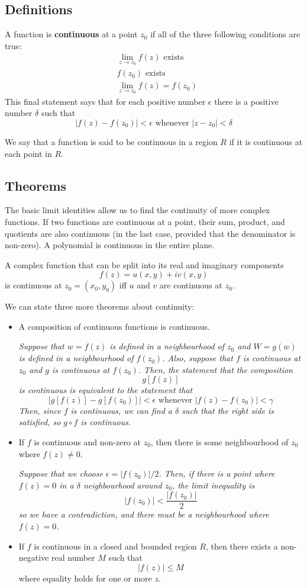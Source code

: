 \documentclass{article}
\renewcommand{\emph}{\textbf}
\begin{document}
\subsection{Definitions}
A function is \emph{continuous} at a point $z_0$ if all of the three following conditions are true:
\begin{align*}
	&\lim_{z \to z_0} f(z) \text{ exists} \\
	&f(z_0) \text{ exists} \\
	&\lim_{z \to z_0} f(z) = f(z_0)
\end{align*}
This final statement says that for each positive number $\epsilon$ there is a positive number $\delta$ such that
\[
	|f(z) - f(z_0)| < \epsilon \text{ whenever } |z - z_0| < \delta
\]

We say that a function is said to be continuous in a region $R$ if it is continuous at each point in $R$. 

\subsection{Theorems}
The basic limit identities allow us to find the continuity of more complex functions. If two functions are continuous at a point, their sum, product, and quotients are also continuous (in the last case, provided that the denominator is non-zero). A polynomial is continuous in the entire plane.

A complex function that can be split into its real and imaginary components
\[
	f(z) = u(x, y) + iv(x, y)
\]
is continuous at $z_0 = (x_0, y_0)$ iff $u$ and $v$ are continuous at $z_0$.

We can state three more theorems about continuity:
\begin{itemize}
	\item A composition of continuous functions is continuous.
	
	\textit{Suppose that $w = f(z)$ is defined in a neighbourhood of $z_0$ and $W = g(w)$ is defined in a neighbourhood of $f(z_0)$. Also, suppose that $f$ is continuous at $z_0$ and $g$ is continuous at $f(z_0)$. Then, the statement that the composition
	\[
		g[f(z)]
	\]
	is continuous is equivalent to the statement that
	\[
		|g[f(z)] - g[f(z_0)]| < \epsilon  \text{ whenever } | f(z) - f(z_0)| < \gamma
	\]
	Then, since $f$ is continuous, we can find a $\delta$ such that the right side is satisfied, so $g \circ f$ is continuous.
	}
	
	\item If $f$ is continuous and non-zero at $z_0$, then there is some neighbourhood of $z_0$ where $f(z) \neq 0$.
	
	\textit{Suppose that we choose $\epsilon = |f(z_0)| / 2$. Then, if there is a point where $f(z) = 0$ in a $\delta$ neighbourhood around $z_0$, the limit inequality is
	\[
		|f(z_0)| < \frac{|f(z_0)|}{2}
	\]
	so we have a contradiction, and there must be a neighbourhood where $f(z) = 0$.
	}
	
	\item If $f$ is continuous in a closed and bounded region $R$, then there exists a non-negative real number $M$ such that
	\[
		|f(z)| \le M
	\]
	where equality holds for one or more $z$.
\end{itemize}
\end{document}
